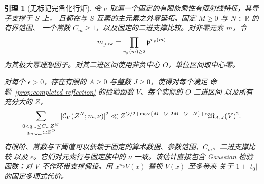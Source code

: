 \documentclass[11pt,a4paper]{article}
\numberwithin{equation}{section}
\numberwithin{figure}{section}
\newtheorem{lemma}[theorem]{引理}
\theoremstyle{definition}
\theoremstyle{remark}
\begin{document}
\begin{lemma}[无标记完备化行矩]
\label{lem:unmarked-completed-moment}
令 $\nu$ 取遍一个固定的有限族乘性有限射线特征，其导子支撑于 $S$ 上，
且都在与 $S$ 互素的主元素之外零延拓。固定 $M\ge0$ 与 $N\in\mathbb R$ 的有界范围、
一个常数 $C_m\ge1$，以及固定的二进支撑比较。对非零元素 $m$，令
\[
 m_{\rm pow}=\prod_{v_{\mathfrak p}(m)\ge2}
                 \mathfrak p^{v_{\mathfrak p}(m)}
\]
为其极大幂理想因子。对其二进区间使用非负中心 $O$，单位区间取中心零。

对每个 $\epsilon>0$，存在有限的 $A\ge0$ 与整数 $J\ge0$，使得对每个满足
命题~\ref{prop:completed-reflection} 的检验函数 $V$、每个实际的 $O$-二进区间
以及所有充分大的 $Z$，
\begin{equation}\label{eq:unmarked-completed-moment}
 \sum_{\substack{0<q_m\le C_mZ^M\\q_{m_{\rm pow}}\asymp Z^O}}
       |\mathcal C_V(Z^N;m,\nu)|^2
 \ll Z^{O/2+\max\{M-O,\,2M-O-N\}+\epsilon}
       \mathfrak M_{A,J}(V)^2.
\end{equation}
有限阶、常数与下阈值可以依赖于固定的算术数据、参数范围、$C_m$、二进支撑比较
以及 $\epsilon$。它们对元素行与固定族中的 $\nu$ 一致。该估计直接包含 Gaussian
检验函数；对 $V$ 不作环带支撑假设。用 $x^{it_0}V(x)$ 替换 $V(x)$ 至多带来
关于 $1+|t_0|$ 的固定多项式代价。
\end{lemma}
\end{document}
